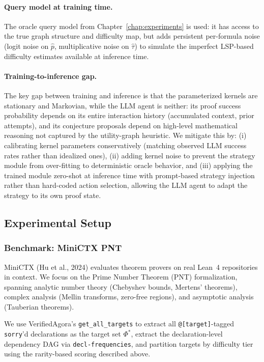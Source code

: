 \paragraph{Query model at training time.}
The oracle query model from Chapter~\ref{chap:experiments} is used: it has access to the true graph structure and difficulty map, but adds persistent per-formula noise (logit noise on $\hat{p}$, multiplicative noise on $\hat{\tau}$) to simulate the imperfect LSP-based difficulty estimates available at inference time.
 
\paragraph{Training-to-inference gap.}
The key gap between training and inference is that the parameterized kernels are stationary and Markovian, while the LLM agent is neither: its proof success probability depends on its entire interaction history (accumulated context, prior attempts), and its conjecture proposals depend on high-level mathematical reasoning not captured by the utility-graph heuristic. We mitigate this by: (i) calibrating kernel parameters conservatively (matching observed LLM success rates rather than idealized ones), (ii) adding kernel noise to prevent the strategy module from over-fitting to deterministic oracle behavior, and (iii) applying the trained module zero-shot at inference time with prompt-based strategy injection rather than hard-coded action selection, allowing the LLM agent to adapt the strategy to its own proof state.

\subsection{Experimental Setup}\label{sec:experiments}

\subsubsection{Benchmark: MiniCTX PNT}\label{sec:minictx}

MiniCTX (Hu et al., 2024) evaluates theorem provers on real Lean~4 repositories in context. We focus on the Prime Number Theorem (PNT) formalization, spanning analytic number theory (Chebyshev bounds, Mertens' theorems), complex analysis (Mellin transforms, zero-free regions), and asymptotic analysis (Tauberian theorems).

We use VerifiedAgora's \texttt{get\_all\_targets} to extract all \texttt{@[target]}-tagged \texttt{sorry}'d declarations as the target set $\Phi^*$, extract the declaration-level dependency DAG via \texttt{decl-frequencies}, and partition targets by difficulty tier using the rarity-based scoring described above.

